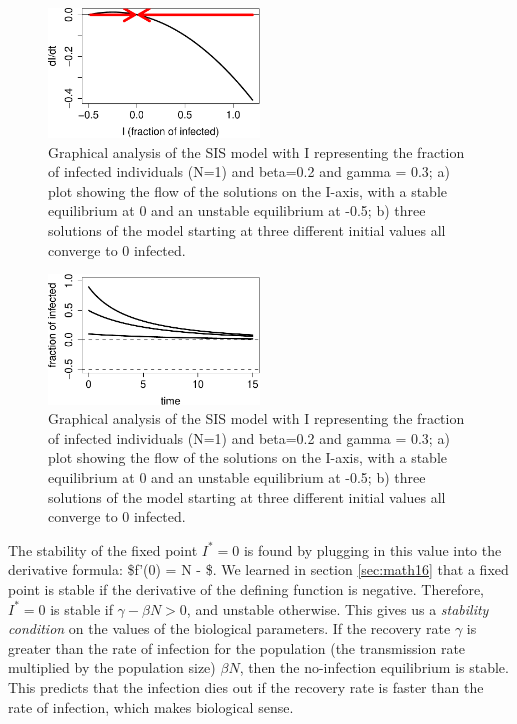 \documentclass[
  letterpaper,
  DIV=11,
  numbers=noendperiod]{scrreprt}
\begin{document}
\begin{figure}

{\centering \includegraphics[width=0.5\textwidth,height=\textheight]{./graph_odes_files/figure-pdf/ch7-flow-sis2-1.pdf}

}

\caption{Graphical analysis of the SIS model with I representing the
fraction of infected individuals (N=1) and beta=0.2 and gamma = 0.3; a)
plot showing the flow of the solutions on the I-axis, with a stable
equilibrium at 0 and an unstable equilibrium at -0.5; b) three solutions
of the model starting at three different initial values all converge to
0 infected.}

\end{figure}

\begin{figure}

{\centering \includegraphics[width=0.5\textwidth,height=\textheight]{./graph_odes_files/figure-pdf/ch7-flow-sis2-2.pdf}

}

\caption{Graphical analysis of the SIS model with I representing the
fraction of infected individuals (N=1) and beta=0.2 and gamma = 0.3; a)
plot showing the flow of the solutions on the I-axis, with a stable
equilibrium at 0 and an unstable equilibrium at -0.5; b) three solutions
of the model starting at three different initial values all converge to
0 infected.}

\end{figure}

The stability of the fixed point \(I^* = 0\) is found by plugging in
this value into the derivative formula: \$f'(0) = \beta N - \gamma \$.
We learned in section \ref{sec:math16} that a fixed point is stable if
the derivative of the defining function is negative. Therefore,
\(I^* = 0\) is stable if \(\gamma - \beta N > 0\), and unstable
otherwise. This gives us a
 \emph{stability
condition} on the values of the biological parameters. If the recovery
rate \(\gamma\) is greater than the rate of infection for the population
(the transmission rate multiplied by the population size) \(\beta N\),
then the no-infection equilibrium is stable. This predicts that the
infection dies out if the recovery rate is faster than the rate of
infection, which makes biological sense.
\end{document}
